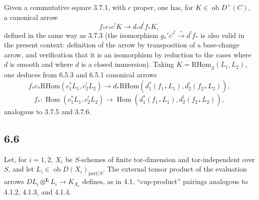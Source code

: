 \documentclass[11pt]{article}
\DeclareMathOperator{\Hom}{Hom}
\providecommand{\Hom}{\operatorname{Hom}}
\providecommand{\Hom}{\operatorname{Hom}}
\begin{document}
Given a commutative square 3.7.1, with $c$ proper, one has, for $K\in\operatorname{ob}D^+(C)$, a canonical arrow
\begin{equation}
\tag{6.5.3}
f_*c_*c^!K\longrightarrow d_*d^!f_*K,
\end{equation}
defined in the same way as 3.7.3 (the isomorphism $g_*'c'^!\xrightarrow{\sim}d^!f_*$ is also valid in the present context: definition of the arrow by transposition of a base-change arrow, and verification that it is an isomorphism by reduction to the cases where $d$ is smooth and where $d$ is a closed immersion). Taking $K=\mathrm{R}\underline{\mathrm{Hom}}_S(L_1,L_2)$, one deduces from 6.5.3 and 6.5.1 canonical arrows
\begin{equation}
\tag{6.5.4}
f_*c_*\mathrm{R}\underline{\mathrm{Hom}}(c_1^*L_1,c_2^!L_2)\longrightarrow d_*\mathrm{R}\underline{\mathrm{Hom}}(d_1^*(f_{1*}L_1),d_2^!(f_{2*}L_2)),
\end{equation}
\begin{equation}
\tag{6.5.5}
f_*:\Hom(c_1^*L_1,c_2^!L_2)\longrightarrow\Hom(d_1^*(f_{1*}L_1),d_2^!(f_{2*}L_2)),
\end{equation}
analogous to 3.7.5 and 3.7.6.

\subsection*{6.6}
Let, for $i=1,2$, $X_i$ be $S$-schemes of finite tor-dimension and tor-independent over $S$, and let $L_i\in\operatorname{ob}D(X_i)_{\mathrm{parf}/S}$. The external tensor product of the evaluation arrows $DL_i\otimes^{\mathbf L}L_i\to K_{X_i}$ defines, as in 4.1, ``cup-product'' pairings analogous to 4.1.2, 4.1.3, and 4.1.4.
\end{document}
